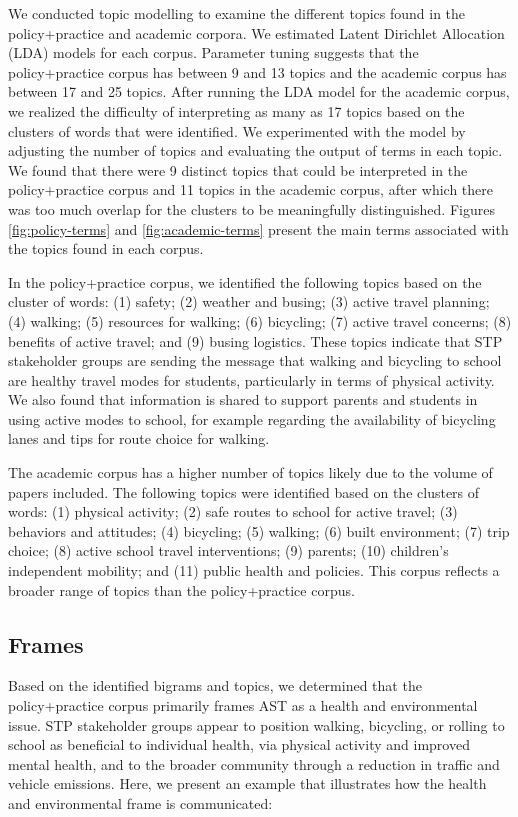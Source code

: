 \documentclass[preprint, 3p,
authoryear]{elsarticle} %
\begin{document}
We conducted topic modelling to examine the different topics found in
the policy+practice and academic corpora. We estimated Latent Dirichlet
Allocation (LDA) models for each corpus. Parameter tuning suggests that
the policy+practice corpus has between 9 and 13 topics and the academic
corpus has between 17 and 25 topics. After running the LDA model for the
academic corpus, we realized the difficulty of interpreting as many as
17 topics based on the clusters of words that were identified. We
experimented with the model by adjusting the number of topics and
evaluating the output of terms in each topic. We found that there were 9
distinct topics that could be interpreted in the policy+practice corpus
and 11 topics in the academic corpus, after which there was too much
overlap for the clusters to be meaningfully distinguished. Figures
\ref{fig:policy-terms} and \ref{fig:academic-terms} present the main
terms associated with the topics found in each corpus.

In the policy+practice corpus, we identified the following topics based
on the cluster of words: (1) safety; (2) weather and busing; (3) active
travel planning; (4) walking; (5) resources for walking; (6) bicycling;
(7) active travel concerns; (8) benefits of active travel; and (9)
busing logistics. These topics indicate that STP stakeholder groups are
sending the message that walking and bicycling to school are healthy
travel modes for students, particularly in terms of physical activity.
We also found that information is shared to support parents and students
in using active modes to school, for example regarding the availability
of bicycling lanes and tips for route choice for walking.

The academic corpus has a higher number of topics likely due to the
volume of papers included. The following topics were identified based on
the clusters of words: (1) physical activity; (2) safe routes to school
for active travel; (3) behaviors and attitudes; (4) bicycling; (5)
walking; (6) built environment; (7) trip choice; (8) active school
travel interventions; (9) parents; (10) children's independent mobility;
and (11) public health and policies. This corpus reflects a broader
range of topics than the policy+practice corpus.

\hypertarget{frames}{%
\subsection{Frames}\label{frames}}

Based on the identified bigrams and topics, we determined that the
policy+practice corpus primarily frames AST as a health and
environmental issue. STP stakeholder groups appear to position walking,
bicycling, or rolling to school as beneficial to individual health, via
physical activity and improved mental health, and to the broader
community through a reduction in traffic and vehicle emissions. Here, we
present an example that illustrates how the health and environmental
frame is communicated:
\end{document}
